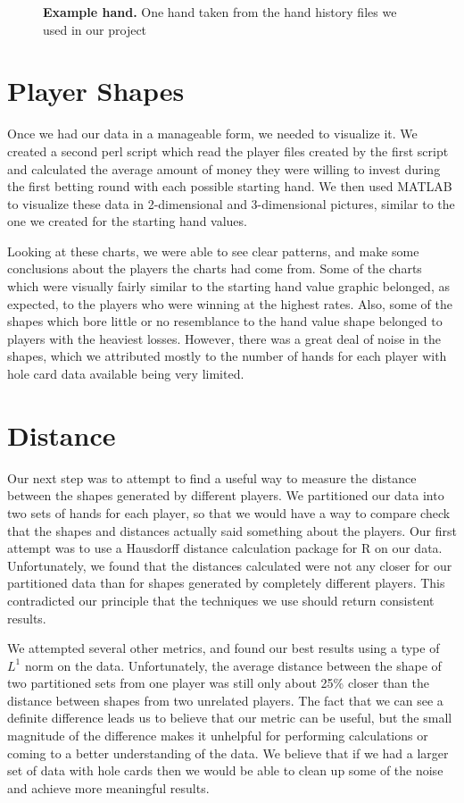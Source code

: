 \documentclass[11pt]{article}
\begin{document}
\begin{figure}[ht!]
  		\caption{\textbf{Example hand.} One hand taken from the hand history files
  		we used in our project}
\end{figure}

\section*{Player Shapes}
Once we had our data in a manageable form, we needed to visualize it. We created
a second perl script which read the player files created by the first script and 
calculated the average amount of money they were willing to invest during the
first betting round with each possible starting hand. We then used MATLAB to
visualize these data in 2-dimensional and 3-dimensional pictures, similar to the
one we created for the starting hand values.

Looking at these charts, we were able to see clear patterns, and make some
conclusions about the players the charts had come from. Some of the charts which
were visually fairly similar to the starting hand value graphic belonged, as
expected, to the players who were winning at the highest rates. Also,
some of the shapes which bore little or no resemblance to the hand value shape
belonged to players with the heaviest losses. However, there was a great deal
of noise in the shapes, which we attributed mostly to the number of hands for each
player with hole card data available being very limited.

\section*{Distance}
Our next step was to attempt to find a useful way to measure the distance
between the shapes generated by different players. We partitioned our data into
two sets of hands for each player, so that we would have a way to compare check
that the shapes and distances actually said something about the players. Our
first attempt was to use a Hausdorff distance calculation package for R on our 
data. Unfortunately, we found that the distances calculated were not any closer
for our partitioned data than for shapes generated by completely different players.
This contradicted our principle that the techniques we use should return consistent
results.

We attempted several other metrics, and found our best results using a type of
$L^1$ norm on the data. Unfortunately, the average distance between the shape of
two partitioned sets from one player was still only about 25\% closer than the
distance between shapes from two unrelated players. The fact that we can see a
definite difference leads us to believe that our metric can be useful, but the
small magnitude of the difference makes it unhelpful for performing calculations
or coming to a better understanding of the data. We believe that if we had a larger
set of data with hole cards then we would be able to clean up some of the noise
and achieve more meaningful results.
\end{document}
